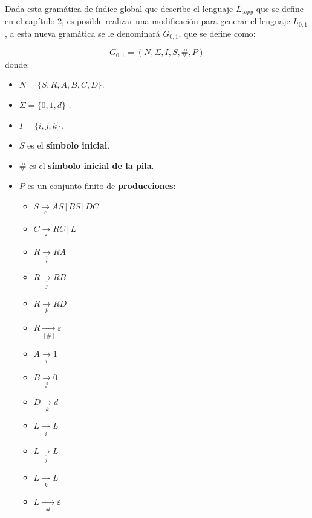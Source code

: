 \documentclass[12pt]{article}
\begin{document}
Dada esta gramática de índice global que describe el lenguaje $L_{copy}^+$ que se define en el capítulo 2, es posible realizar una modificación para generar el lenguaje 
$L_{0,1}$, a esta nueva gramática se le denominará $G_{0,1}$, que se define como:

$$
    G_{0,1} = (N, \Sigma, I, S, \#, P) 
$$
donde:

\begin{itemize}
    \item $N= \{S,R,A,B,C,D\}$.
    \item \( \Sigma=\{0,1,d\} \) .
    \item $I=\{i,j,k\}$.
    \item $S$ es el \textbf{símbolo inicial}.
    \item $\#$ es el \textbf{símbolo inicial de la pila}.
    \item $P$ es un conjunto finito de \textbf{producciones}:
          \begin{multicols}{2}
              \begin{itemize}
                  \item $S\underset{\varepsilon}{\to} AS\,|\,BS\,|\,DC$
                  \item $C\underset{\varepsilon}{\to} RC\,|\,L$
                  \item $R\underset{\overline{i}}{\to} RA$
                  \item $R\underset{\overline{j}}{\to} RB$
                  \item $R\underset{\overline{k}}{\to} RD$
                        
                  \item $R\underset{[\#]}{\to} \varepsilon$
                  \item $A\underset{i}{\to} 1$
                  \item $B\underset{j}{\to} 0$
                  \item $D\underset{k}{\to} d$
                  \item $L\underset{\overline{i}}{\to} L$
                  \item $L\underset{\overline{j}}{\to} L$
                  \item $L\underset{\overline{k}}{\to} L$
                  \item $L\underset{[\#]}{\to} \varepsilon$
              \end{itemize}
          \end{multicols}
\end{itemize}
\end{document}
